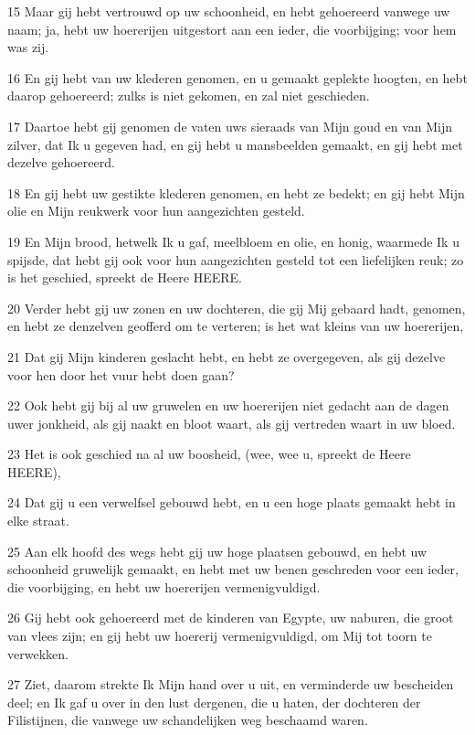 \par 15 Maar gij hebt vertrouwd op uw schoonheid, en hebt gehoereerd vanwege uw naam; ja, hebt uw hoererijen uitgestort aan een ieder, die voorbijging; voor hem was zij.
\par 16 En gij hebt van uw klederen genomen, en u gemaakt geplekte hoogten, en hebt daarop gehoereerd; zulks is niet gekomen, en zal niet geschieden.
\par 17 Daartoe hebt gij genomen de vaten uws sieraads van Mijn goud en van Mijn zilver, dat Ik u gegeven had, en gij hebt u mansbeelden gemaakt, en gij hebt met dezelve gehoereerd.
\par 18 En gij hebt uw gestikte klederen genomen, en hebt ze bedekt; en gij hebt Mijn olie en Mijn reukwerk voor hun aangezichten gesteld.
\par 19 En Mijn brood, hetwelk Ik u gaf, meelbloem en olie, en honig, waarmede Ik u spijsde, dat hebt gij ook voor hun aangezichten gesteld tot een liefelijken reuk; zo is het geschied, spreekt de Heere HEERE.
\par 20 Verder hebt gij uw zonen en uw dochteren, die gij Mij gebaard hadt, genomen, en hebt ze denzelven geofferd om te verteren; is het wat kleins van uw hoererijen,
\par 21 Dat gij Mijn kinderen geslacht hebt, en hebt ze overgegeven, als gij dezelve voor hen door het vuur hebt doen gaan?
\par 22 Ook hebt gij bij al uw gruwelen en uw hoererijen niet gedacht aan de dagen uwer jonkheid, als gij naakt en bloot waart, als gij vertreden waart in uw bloed.
\par 23 Het is ook geschied na al uw boosheid, (wee, wee u, spreekt de Heere HEERE),
\par 24 Dat gij u een verwelfsel gebouwd hebt, en u een hoge plaats gemaakt hebt in elke straat.
\par 25 Aan elk hoofd des wegs hebt gij uw hoge plaatsen gebouwd, en hebt uw schoonheid gruwelijk gemaakt, en hebt met uw benen geschreden voor een ieder, die voorbijging, en hebt uw hoererijen vermenigvuldigd.
\par 26 Gij hebt ook gehoereerd met de kinderen van Egypte, uw naburen, die groot van vlees zijn; en gij hebt uw hoererij vermenigvuldigd, om Mij tot toorn te verwekken.
\par 27 Ziet, daarom strekte Ik Mijn hand over u uit, en verminderde uw bescheiden deel; en Ik gaf u over in den lust dergenen, die u haten, der dochteren der Filistijnen, die vanwege uw schandelijken weg beschaamd waren.
